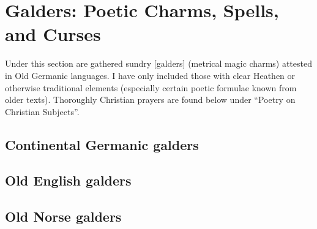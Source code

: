 \part{Galders: Poetic Charms, Spells, and Curses}

Under this section are gathered sundry [galders] (metrical magic charms) attested in Old Germanic languages.  I have only included those with clear Heathen or otherwise traditional elements (especially certain poetic formulae known from older texts).  Thoroughly Christian prayers are found below under “Poetry on Christian Subjects”.


\chapter{Continental Germanic galders}





\chapter{Old English galders}







\chapter{Old Norse galders}









